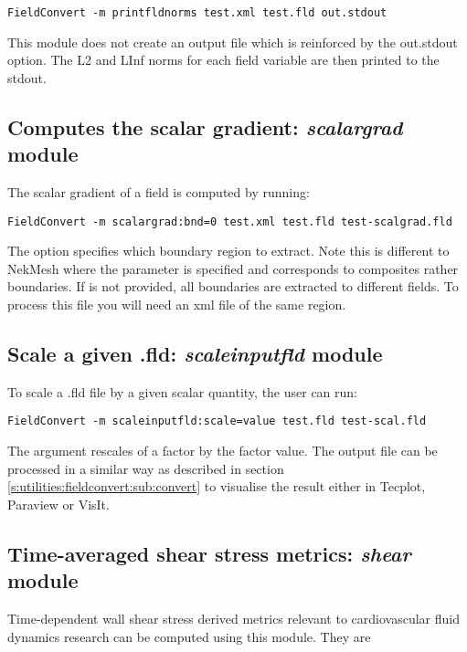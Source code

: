 \begin{lstlisting}[style=BashInputStyle]
FieldConvert -m printfldnorms test.xml test.fld out.stdout
\end{lstlisting}

This module does not create an output file which is reinforced by the
out.stdout option. The L2 and LInf norms for each field variable are
then printed to the stdout.
%
%
%

\subsection{Computes the scalar gradient: \textit{scalargrad} module}
The scalar gradient of a field is computed by running:
\begin{lstlisting}[style=BashInputStyle]
FieldConvert -m scalargrad:bnd=0 test.xml test.fld test-scalgrad.fld
\end{lstlisting}
The option  specifies which boundary region to extract. Note this is different to NekMesh where the parameter  is specified and corresponds to composites rather boundaries. If  is not provided, all boundaries are extracted to different fields. To process this file you will need an xml file of the same region.

%
%
%

\subsection{Scale a given .fld: \textit{scaleinputfld} module}
To scale a .fld file by a given scalar quantity, the user can run:
\begin{lstlisting}[style=BashInputStyle]
FieldConvert -m scaleinputfld:scale=value test.fld test-scal.fld
\end{lstlisting}
The argument  rescales of a factor 
 by the factor value.
The output file  can be processed in a similar
way as described in section \ref{s:utilities:fieldconvert:sub:convert}
to visualise the result  either in Tecplot, Paraview or VisIt.

%
%
%
\subsection{Time-averaged shear stress metrics: \textit{shear} module}
Time-dependent wall shear stress derived metrics relevant to cardiovascular fluid dynamics research can be computed using this module. They are

